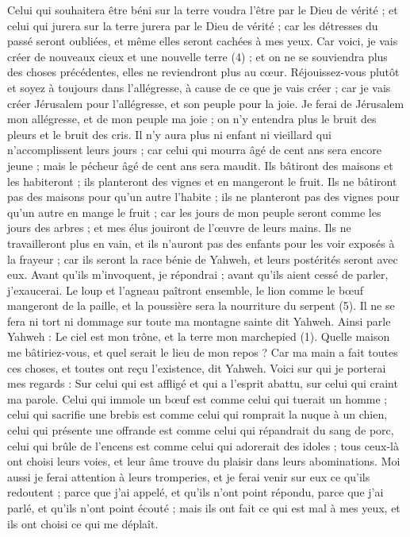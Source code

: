 \begin{multicols}{2}
Celui qui souhaitera être béni sur la terre voudra l’être par le Dieu de vérité ; et celui qui jurera sur la terre jurera par le Dieu de vérité ; car les détresses du passé seront oubliées, et même elles seront cachées à mes yeux.
Car voici, je vais créer de nouveaux cieux et une nouvelle terre (4) ; et on ne se souviendra plus des choses précédentes, elles ne reviendront plus au cœur.
Réjouissez-vous plutôt et soyez à toujours dans l’allégresse, à cause de ce que je vais créer ; car je vais créer Jérusalem pour l’allégresse, et son peuple pour la joie.
Je ferai de Jérusalem mon allégresse, et de mon peuple ma joie ; on n'y entendra plus le bruit des pleurs et le bruit des cris.
Il n'y aura plus ni enfant ni vieillard qui n’accomplissent leurs jours ; car celui qui mourra âgé de cent ans sera encore jeune ; mais le pécheur âgé de cent ans sera maudit.
Ils bâtiront des maisons et les habiteront ; ils planteront des vignes et en mangeront le fruit.
Ils ne bâtiront pas des maisons pour qu'un autre l’habite ; ils ne planteront pas des vignes pour qu'un autre en mange le fruit ; car les jours de mon peuple seront comme les jours des arbres ; et mes élus jouiront de l’œuvre de leurs mains.
Ils ne travailleront plus en vain, et ils n’auront pas des enfants pour les voir exposés à la frayeur ; car ils seront la race bénie de Yahweh, et leurs postérités seront avec eux.
Avant qu’ils m’invoquent, je répondrai ; avant qu’ils aient cessé de parler, j’exaucerai.
Le loup et l'agneau paîtront ensemble, le lion comme le bœuf mangeront de la paille, et la poussière sera la nourriture du serpent (5). Il ne se fera ni tort ni dommage sur toute ma montagne sainte dit Yahweh.
\VerseOne{}Ainsi parle Yahweh : Le ciel est mon trône, et la terre mon marchepied (1). Quelle maison me bâtiriez-vous, et quel serait le lieu de mon repos ?
Car ma main a fait toutes ces choses, et toutes ont reçu l’existence, dit Yahweh. Voici sur qui je porterai mes regards : Sur celui qui est affligé et qui a l'esprit abattu, sur celui qui craint ma parole.
Celui qui immole un bœuf est comme celui qui tuerait un homme ; celui qui sacrifie une brebis est comme celui qui romprait la nuque à un chien, celui qui présente une offrande est comme celui qui répandrait du sang de porc, celui qui brûle de l’encens est comme celui qui adorerait des idoles ; tous ceux-là ont choisi leurs voies, et leur âme trouve du plaisir dans leurs abominations.
Moi aussi je ferai attention à leurs tromperies, et je ferai venir sur eux ce qu’ils redoutent ; parce que j'ai appelé, et qu'ils n’ont point répondu, parce que j'ai parlé, et qu'ils n'ont point écouté ; mais ils ont fait ce qui est mal à mes yeux, et ils ont choisi ce qui me déplaît.

\end{multicols}
